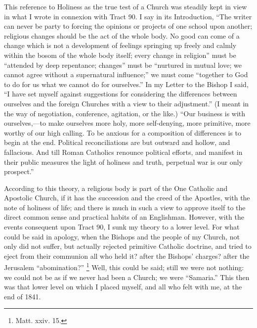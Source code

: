 This reference to Holiness as the true test of a Church was steadily
kept in view in what I wrote in connexion with Tract 90. I say in its
Introduction, ``The writer can never be party to forcing the
opinions or projects of one school upon another; religious changes
should be the act of the whole body. No good can come of a change which
is not a development of feelings springing up freely and calmly within
the bosom of the whole body itself; every change in religion'' must
be ``attended by deep repentance; changes'' must be
``nurtured in mutual love; we cannot agree without a supernatural
influence;'' we must come ``together to God to do for us what we
cannot do for ourselves.'' In my Letter to the Bishop I said,
``I have set myself against suggestions for considering the
differences between ourselves and the foreign Churches with a view to
their adjustment.'' (I meant in the way of negotiation, conference,
agitation, or the like.) ``Our business is with ourselves,—to make
ourselves more holy, more self-denying, more primitive, more worthy of
our high calling. To be anxious for a composition of differences is to
begin at the end. Political reconciliations are but outward and hollow,
and fallacious. And till Roman Catholics renounce political efforts, and
manifest in their public measures the light of holiness and truth,
perpetual war is our only prospect.''

According to this theory, a religious body is part of the One
Catholic and Apostolic Church, if it has the succession and the creed of
the Apostles, with the note of holiness of life; and there is much in
such a view to approve itself to the direct common sense and
practical habits of an Englishman. However, with the events
consequent upon Tract 90, I sunk my theory to a lower level. For what could be said in apology, when the Bishops and the people of my
Church, not only did not suffer, but actually rejected primitive
Catholic doctrine, and tried to eject from their communion all who held
it? after the Bishops' charges? after the Jerusalem ``abomination?''
\footnote{Matt. xxiv. 15.} Well, this could be said; still we were not
nothing: we could not be as if we never had been a Church; we were
``Samaria.'' This then was that lower level on which I placed
myself, and all who felt with me, at the end of 1841.

